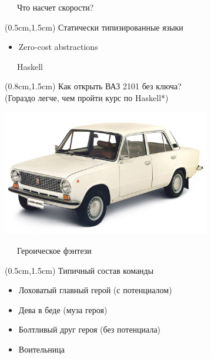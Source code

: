 \documentclass[xetex,18pt,aspectratio=43]{beamer}
\begin{document}
\begin{Large}
\begin{frame}{\ \ \ Что насчет скорости?}
\begin{textblock*}{\framewidth}(0.5cm,1.5cm)
  Статически типизированные языки
\begin{itemize}
  \item Zero-cost abstractions
\end{itemize}
\end{textblock*}
\end{frame}

\begin{frame}{\ \ \ Haskell}
\begin{textblock*}{\framewidth}(0.8cm,1.5cm)
Как открыть ВАЗ 2101 без ключа?\\
{\small (Гораздо легче, чем пройти курс по Haskell*)}
\begin{minipage}{\textwidth}
  \centering
  \includegraphics[height=5.5cm]{img/lada_2101_1.jpg}
\end{minipage}
\end{textblock*}
\end{frame}

\begin{frame}{\ \ \ Героическое фэнтези}
\begin{textblock*}{\framewidth-0.8cm}(0.5cm,1.5cm)
  Типичный состав команды
\begin{itemize}
  \item Лоховатый главный герой (с потенциалом)
  \item Дева в беде (муза героя)
  \item Болтливый друг героя (без потенциала)
  \item Воительница
\end{itemize}
\end{textblock*}
\end{frame}


\end{Large}
\end{document}
